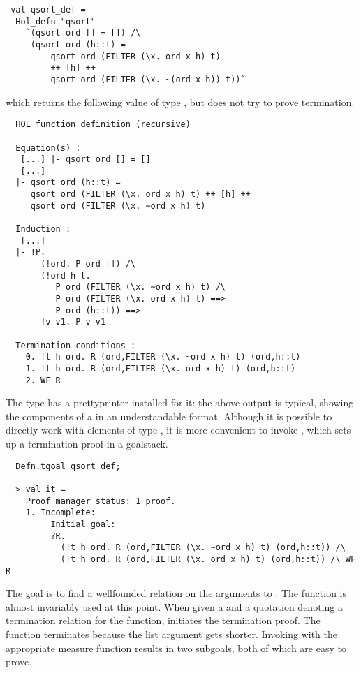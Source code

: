 \setcounter{sessioncount}{0}
\begin{session}
\begin{hol}
\begin{verbatim}
 val qsort_def =
  Hol_defn "qsort"
    `(qsort ord [] = []) /\
     (qsort ord (h::t) =
         qsort ord (FILTER (\x. ord x h) t) 
         ++ [h] ++ 
         qsort ord (FILTER (\x. ~(ord x h)) t))`
\end{verbatim}
\end{hol}
\end{session}
which returns the following value of type , but does not try 
to prove termination. 
\begin{session}
\begin{hol}
\begin{verbatim}
  HOL function definition (recursive)
    
  Equation(s) :
   [...] |- qsort ord [] = []
   [...]
  |- qsort ord (h::t) =
     qsort ord (FILTER (\x. ord x h) t) ++ [h] ++
     qsort ord (FILTER (\x. ~ord x h) t)
    
  Induction :
   [...]
  |- !P.
       (!ord. P ord []) /\
       (!ord h t.
          P ord (FILTER (\x. ~ord x h) t) /\
          P ord (FILTER (\x. ord x h) t) ==>
          P ord (h::t)) ==>
       !v v1. P v v1
    
  Termination conditions :
    0. !t h ord. R (ord,FILTER (\x. ~ord x h) t) (ord,h::t)
    1. !t h ord. R (ord,FILTER (\x. ord x h) t) (ord,h::t)
    2. WF R
\end{verbatim}
\end{hol}
\end{session}

The type  has a prettyprinter installed for it: the above
output is typical, showing the components of a  in an understandable
format. Although it is possible to directly work with elements of
type \ml{defn}, it is more convenient to invoke 
\ml{Defn.tgoal}, which sets up a termination proof in a goalstack. 
%
\begin{session}
\begin{hol}
\begin{verbatim}
  Defn.tgoal qsort_def;

  > val it =
    Proof manager status: 1 proof.
    1. Incomplete:
         Initial goal:
         ?R.
           (!t h ord. R (ord,FILTER (\x. ~ord x h) t) (ord,h::t)) /\
           (!t h ord. R (ord,FILTER (\x. ord x h) t) (ord,h::t)) /\ WF R
\end{verbatim}
\end{hol}
\end{session}
%
The goal is to find a wellfounded relation on the arguments to .
The function  is almost invariably used at this point.
When given a  and a quotation denoting a termination relation
for the function,  initiates the termination proof.
The \ml{qsort} function terminates because the list argument gets
shorter. Invoking \ml{WF\_REL\_TAC} with the appropriate measure 
function results in two subgoals, both of which are easy to
prove.

